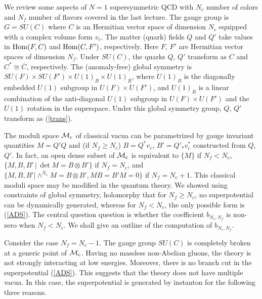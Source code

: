 \documentclass[lecture]{qft-l}
\newcommand{\set}[2]{\{{#1}\,|\,{#2}\}}
\newcommand{\MM}{{\mathcal M}}
\newcommand{\MC}{\MM_{{\rm c}}}
\newcommand{\Hom}{{\rm Hom}}
\newcommand{\FT}{F'}%
\newcommand{\QT}{Q'}%
\newcommand{\BT}{B'}%
\numberwithin{figure}{chapter}
\begin{document}


We review some aspects of $N=1$ supersymmetric QCD with $N_c$ number of 
colors and $N_f$ number of flavors covered in the last lecture.
The gauge group is $G=SU(C)$ where $C$ is an Hermitian vector space of 
dimension $N_c$ equipped with a complex volume form $v_c$.
The matter (quark) fields $Q$ and $\QT$ take values in $\Hom(F,C)$ and
$\Hom(C,\FT)$, respectively.
Here $F$, $\FT$ are Hermitian vector spaces of dimension $N_f$.
Under $SU(C)$, the quarks $Q$, $\QT$ transform as $C$ and $C^*\cong\bar{C}$,
respectively.
The (anomaly-free) global symmetry is 
$SU(F)\times SU(\FT)\times U(1)_B\times U(1)_R$, where $U(1)_B$ is the
diagonally embedded $U(1)$ subgroup in $U(F)\times U(\FT)$,
and $U(1)_R$ is a linear combination of the anti-diagonal $U(1)$ subgroup
in $U(F)\times U(\FT)$ and the $U(1)$ rotation in the superspace.
Under this global symmetry group, $Q$, $\QT$ transform as (\ref{trans}).

The moduli space $\MC$ of classical vacua can be parametrized by gauge 
invariant quantities $M=\QT Q$ and (if $N_f\ge N_c$) $B=Q^*v_c$,
$\BT=\QT_*v_c^*$ constructed from $Q$, $\QT$.
In fact, an open dense subset of $\MC$ is equivalent to
$\{M\}$ if $N_f<N_c$, $\set{M,B,\BT}{\det M=B\otimes\BT}$ if $N_f=N_c$,
and $\{M,B,\BT \vert\wedge^{N_c}M=B\otimes\BT, MB=\BT M=0\}$ if $N_f=N_c+1$.
This classical moduli space may be modified in the quantum theory.
We showed using constraints of global symmetry, holomorphy
that for $N_f\ge N_c$, no superpotential can be dynamically generated,
whereas for $N_f<N_c$, the only possible form is (\ref{ADS}).
The central question question is whether the coefficient $b_{N_c,N_f}$
is non-zero when $N_f<N_c$.
We shall give an outline of the computation of $b_{N_c,N_f}$.


Consider the case $N_f=N_c-1$.
The gauge group $SU(C)$ is completely broken at a generic point of $\MC$.
Having no massless non-Abelian gluons, the theory is not strongly interacting
at low energies.
Moreover, there is no branch cut in the superpotential (\ref{ADS}).
This suggests that the theory does not have multiple vacua. 
In this case, the superpotential is generated by instanton for the following 
three reasons.
\end{document}
